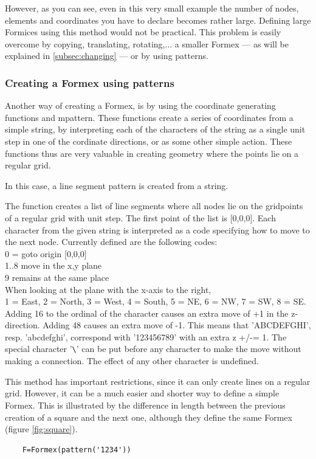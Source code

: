 However, as you can see, even in this very small example the number of nodes, elements and coordinates you have to declare becomes rather large. Defining large Formices using this method would not be practical. This problem is easily overcome by copying, translating, rotating,... a smaller Formex --- as will be explained in \ref{subsec:changing} --- or by using patterns.
 
\subsubsection{Creating a Formex using patterns}

Another way of creating a Formex, is by using the coordinate generating functions  and {mpattern}. These functions create a series of coordinates from a simple string, by interpreting each of the characters of the string as a single unit step in one of the cordinate directions, or as some other simple action. These functions thus are very valuable in creating geometry where the points lie on a regular grid.

 


In this case, a line segment pattern is created from a string.

The function  creates a list of line segments where all nodes lie on the
gridpoints of a regular grid with unit step.
The first point of the list is [0,0,0]. Each character from the given
string  is interpreted as a code specifying how to move to the next node.
Currently defined are the following codes:\\
    0 = goto origin [0,0,0]\\
    1..8 move in the x,y plane\\
    9 remains at the same place\\
    When looking at the plane with the x-axis to the right,\\
    1 = East, 2 = North, 3 = West, 4 = South, 5 = NE, 6 = NW, 7 = SW, 8 = SE.\\
    Adding 16 to the ordinal of the character causes an extra move of +1 in
    the z-direction. Adding 48 causes an extra move of -1. This means that
    'ABCDEFGHI', resp. 'abcdefghi', correspond with '123456789' with an extra
    z +/-= 1.              
    The special character '\verb?\?' can be put before any character to make the
    move without making a connection.
    The effect of any other character is undefined.

This method has important restrictions, since it can only create lines on a regular grid. However, it can be a much easier and shorter way to define a simple Formex. This is illustrated by the difference in length between the previous creation of a square and the next one, although they define the same Formex (figure \ref{fig:square}).
\begin{verbatim}
	F=Formex(pattern('1234'))
\end{verbatim}

